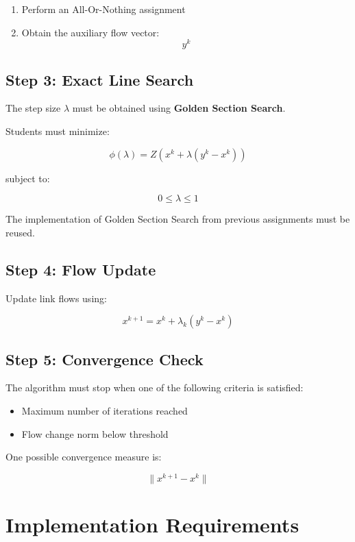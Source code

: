 \documentclass{rapportCS} %
\begin{document}
\begin{enumerate}
    \item Perform an All-Or-Nothing assignment
    \item Obtain the auxiliary flow vector:
\[
y^k
\]
\end{enumerate}

\subsection{Step 3: Exact Line Search}

The step size $\lambda$ must be obtained using \textbf{Golden Section Search}.

Students must minimize:

\[
\phi(\lambda)=Z(x^k+\lambda(y^k-x^k))
\]

subject to:

\[
0 \leq \lambda \leq 1
\]

The implementation of Golden Section Search from previous assignments must be reused.

\subsection{Step 4: Flow Update}

Update link flows using:

\[
x^{k+1}=x^k+\lambda_k(y^k-x^k)
\]

\subsection{Step 5: Convergence Check}

The algorithm must stop when one of the following criteria is satisfied:

\begin{itemize}
    \item Maximum number of iterations reached
    \item Flow change norm below threshold
\end{itemize}

One possible convergence measure is:

\[
\|x^{k+1}-x^k\|
\]

\section{Implementation Requirements}
\end{document}
